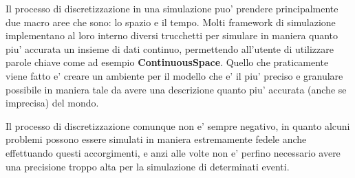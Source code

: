 Il processo di discretizzazione in una simulazione puo' prendere 
principalmente due macro aree che sono: lo spazio e il tempo. 
Molti framework di simulazione implementano al loro interno 
diversi trucchetti per simulare in maniera quanto piu' accurata
un insieme di dati continuo, permettendo all'utente di utilizzare
parole chiave come ad esempio \textbf{ContinuousSpace}. Quello che praticamente
viene fatto e' creare un ambiente per il modello che e' il piu'
preciso e granulare possibile in maniera tale da avere una descrizione
quanto piu' accurata (anche se imprecisa) del mondo. 

Il processo di discretizzazione comunque non e' sempre negativo, 
in quanto alcuni problemi possono essere simulati in maniera 
estremamente fedele anche effettuando questi accorgimenti, e anzi
alle volte non e' perfino necessario avere una precisione troppo 
alta per la simulazione di determinati eventi.